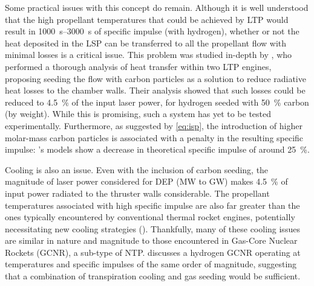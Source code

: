         Some practical issues with this concept do remain. Although it is well understood that the high propellant temperatures that could be achieved by LTP would result in \qtyrange{1000}{3000}{s} of specific impulse (with hydrogen), whether or not the heat deposited in the LSP can be transferred to all the propellant flow with minimal losses is a critical issue. This problem was studied in-depth by \textcite{shojiPerformanceHeatTransfer1976}, who performed a thorough analysis of heat transfer within two LTP engines, proposing seeding the flow with carbon particles as a solution to reduce radiative heat losses to the chamber walls. Their analysis showed that such losses could be reduced to 4.5~\% of the input laser power, for hydrogen seeded with 50~\% carbon (by weight). While this is promising, such a system has yet to be tested experimentally. Furthermore, as suggested by \autoref{eq:isp}, the introduction of higher molar-mass carbon particles is associated with a penalty in the resulting specific impulse: \citeauthor{shojiPerformanceHeatTransfer1976}'s models show a decrease in theoretical specific impulse of around 25~\%.

        Cooling is also an issue. Even with the inclusion of carbon seeding, the magnitude of laser power considered for DEP (MW to GW) makes 4.5~\% of input power radiated to the thruster walls considerable. The propellant temperatures associated with high specific impulse are also far greater than the ones typically encountered by conventional thermal rocket engines, potentially necessitating new cooling strategies (\textcite{noredApplicationHighPower1976}). Thankfully, many of these cooling issues are similar in nature and magnitude to those encountered in Gas-Core Nuclear Rockets (GCNR), a sub-type of NTP. \textcite{kascakNozzleCavityWall1971} discusses a hydrogen GCNR operating at temperatures and specific impulses of the same order of magnitude, suggesting that a combination of transpiration cooling and gas seeding would be sufficient.

